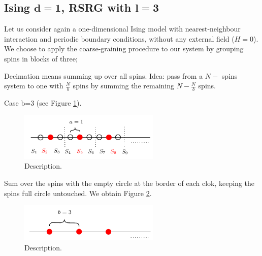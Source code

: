 \documentclass[../main/main.tex]{subfiles}
\begin{document}
\subsection{Ising \( \pmb{d=1} \), RSRG with \( \pmb{l=3} \) }
Let us consider again a one-dimensional Ising model with nearest-neighbour interaction and periodic boundary conditions, without any external field (\( H=0 \)). We choose to apply the coarse-graining procedure to our system by grouping spins in blocks of three;

Decimation means summing up over all spins.
 Idea: pass from a \( N- \) spins system to one with \( \frac{N}{b} \) spins by summing the remaining \( N- \frac{N}{b} \) spins.


Case b=3 (see Figure \ref{fig:20_1}).

\begin{figure}[h!]
\centering
\includegraphics[width=0.6\textwidth]{../lessons/20_image/1.pdf}
\caption{\label{fig:20_1} Description.}
\end{figure}

Sum over the spins with the empty circle at the border of each clok, keeping the spins full circle untouched.
We obtain Figure \ref{fig:20_2}.

\begin{figure}[h!]
\centering
\includegraphics[width=0.6\textwidth]{../lessons/20_image/2.pdf}
\caption{\label{fig:20_2} Description.}
\end{figure}
\end{document}
